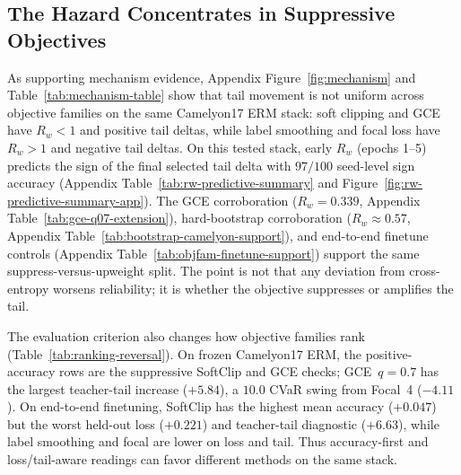 \subsection{The Hazard Concentrates in Suppressive Objectives}
As supporting mechanism evidence, Appendix Figure~\ref{fig:mechanism} and Table~\ref{tab:mechanism-table} show that tail movement is not uniform across objective families on the same Camelyon17 ERM stack: soft clipping and GCE have $R_w<1$ and positive tail deltas, while label smoothing and focal loss have $R_w>1$ and negative tail deltas.
On this tested stack, early $R_w$ (epochs 1--5) predicts the sign of the final selected tail delta with $97/100$ seed-level sign accuracy (Appendix Table~\ref{tab:rw-predictive-summary} and Figure~\ref{fig:rw-predictive-summary-app}).
The GCE corroboration ($R_w=0.339$, Appendix Table~\ref{tab:gce-q07-extension}), hard-bootstrap corroboration ($R_w\approx 0.57$, Appendix Table~\ref{tab:bootstrap-camelyon-support}), and end-to-end finetune controls (Appendix Table~\ref{tab:objfam-finetune-support}) support the same suppress-versus-upweight split.
The point is not that any deviation from cross-entropy worsens reliability; it is whether the objective suppresses or amplifies the tail.

The evaluation criterion also changes how objective families rank (Table~\ref{tab:ranking-reversal}).
On frozen Camelyon17 ERM, the positive-accuracy rows are the suppressive SoftClip and GCE checks; GCE~$q=0.7$ has the largest teacher-tail increase ($+5.84$), a $10.0$ CVaR swing from Focal~4 ($-4.11$).
On end-to-end finetuning, SoftClip has the highest mean accuracy ($+0.047$) but the worst held-out loss ($+0.221$) and teacher-tail diagnostic ($+6.63$), while label smoothing and focal are lower on loss and tail.
Thus accuracy-first and loss/tail-aware readings can favor different methods on the same stack.

